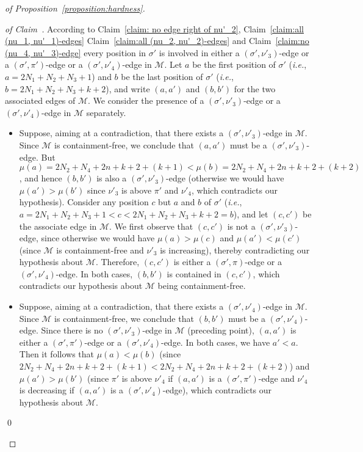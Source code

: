 \begin{proof}[of Proposition~\ref{proposition:hardness}]
  \begin{proof}[of Claim~\label{claim:no (sigma', nu'_3)-edge}]
    According to
    Claim~\ref{claim: no edge right of nu'_2},
    Claim~\ref{claim:all (nu_1, nu'_1)-edges}
    Claim~\ref{claim:all (nu_2, nu'_2)-edges} and
    Claim~\ref{claim:no (nu_4, nu'_3)-edge}
    every position in $\sigma'$ is involved in
    either a $(\sigma', \nu'_3)$-edge
    or a $(\sigma', \pi')$-edge
    or a $(\sigma', \nu'_4)$-edge
    in $\mathcal{M}$.
    Let $a$ be the first position of $\sigma'$
    (\emph{i.e.}, $a = 2N_1 + N_2 + N_3 + 1$)
    and
    $b$ be the last position of $\sigma'$
    (\emph{i.e.}, $b = 2N_1 + N_2 + N_3 + k + 2$),
    and write $(a, a')$ and $(b, b')$ for the two associated edges of $\mathcal{M}$.
    We consider the presence of a $(\sigma', \nu'_3)$-edge
    or a $(\sigma', \nu'_4)$-edge in $\mathcal{M}$ separately.
    \begin{itemize}
      \item
      Suppose, aiming at a contradiction, that there exists
      a $(\sigma', \nu'_3)$-edge in $\mathcal{M}$.
      Since $\mathcal{M}$ is containment-free, we conclude that
      $(a, a')$ must be a $(\sigma', \nu'_3)$-edge.
      But $\mu(a) = 2N_2 + N_4 + 2n + k + 2 + (k+1) <
      \mu(b) = 2N_2 + N_4 + 2n + k + 2 + (k+2)$, and hence
      $(b, b')$ is also a $(\sigma', \nu'_3)$-edge
      (otherwise we would have $\mu(a') > \mu(b')$ since
      $\nu'_3$ is above $\pi'$ and $\nu'_4$,
      which contradicts our hypothesis).
      Consider any position $c$ but $a$ and $b$ of $\sigma'$
      (\emph{i.e.},
      $a = 2N_1 + N_2 + N_3 + 1 < c < 2N_1 + N_2 + N_3 + k + 2 = b$),
      and let $(c, c')$ be the associate edge in $\mathcal{M}$.
      We first observe that $(c, c')$ is not a $(\sigma', \nu'_3)$-edge,
      since otherwise we would have
      $\mu(a) > \mu(c)$ and $\mu(a') < \mu(c')$
      (since $\mathcal{M}$ is containment-free and $\nu'_3$ is increasing),
      thereby contradicting our hypothesis about $\mathcal{M}$.
      Therefore, $(c, c')$ is either a $(\sigma', \pi)$-edge or a $(\sigma', \nu'_4)$-edge.
      In both cases, $(b, b')$ is contained in $(c, c')$,
      which contradicts our hypothesis about $\mathcal{M}$ being containment-free.
      \item
      Suppose, aiming at a contradiction, that there exists
      a $(\sigma', \nu'_4)$-edge in $\mathcal{M}$.
      Since $\mathcal{M}$ is containment-free, we conclude that
      $(b, b')$ must be a $(\sigma', \nu'_4)$-edge.
      Since there is no $(\sigma', \nu'_3)$-edge in $\mathcal{M}$
      (preceding point),
      $(a, a')$ is either a
      $(\sigma', \pi')$-edge or a $(\sigma', \nu'_4)$-edge.
      In both cases, we have $a' < a$.
      Then it follows that
      $\mu(a) < \mu(b)$
      (since $2N_2 + N_4 + 2n + k + 2 + (k+1) < 2N_2 + N_4 + 2n + k + 2 + (k+2)$)
      and
      $\mu(a') > \mu(b')$ (since $\pi'$ is above $\nu'_4$ if $(a, a')$ is
      a $(\sigma', \pi')$-edge and
      $\nu'_4$ is decreasing if $(a, a')$ is
      a $(\sigma', \nu'_4)$-edge),
      which contradicts our hypothesis about $\mathcal{M}$.
    \end{itemize}
    \qed
  \end{proof}


\end{proof}
